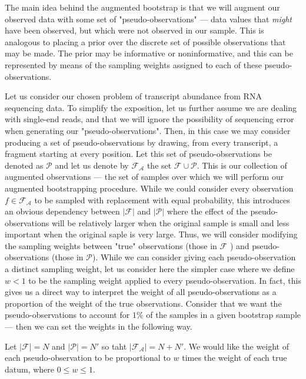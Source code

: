 The main idea behind the augmented bootstrap is that we will augment our observed data with some set 
of "pseudo-observations" --- data values that \textit{might} have been observed, but which were not observed 
in our sample.  This is analogous to placing a prior over the discrete set of possible observations 
that may be made. The prior may be informative or noninformative, and this can be represented by means 
of the sampling weights assigned to each of these pseudo-observations.

Let us consider our chosen problem of transcript abundance from RNA sequencing data. To simplify the 
exposition, let us further assume we are dealing with single-end reads, and that we will ignore the 
possibility of sequencing error when generating our "pseudo-observations". Then, in this case we 
may consider producing a set of pseudo-observations by drawing, from every transcript, a fragment 
starting at every position.  Let this set of pseudo-observations be denoted as $\mathcal{P}$ and 
let us denote by $\mathcal{F_{A}}$ the set $\mathcal{F} \cup \mathcal{P}$. This is our collection 
of augmented observations — the set of samples over which we will perform our augmented 
bootstrapping procedure.  While we could consider every observation $f \in \mathcal{F_{A}}$ to be 
sampled with replacement with equal probability, this introduces an obvious dependency between 
$\left|\mathcal{F}\right|$ and $\left|\mathcal{P}\right|$ where the effect of the 
pseudo-observations will be relatively larger when the original sample is small and less important 
when the original saple is very large.  Thus, we will consider modifying the sampling weights 
between "true" observations (those in $\mathcal{F}$ ) and pseudo-observations 
(those in $\mathcal{P}$).  While we can consider giving each pseudo-observation a distinct sampling 
weight, let us consider here the simpler case where we define $w < 1$ to be the sampling weight 
applied to every pseudo-observation.  In fact, this gives us a direct way to interpret the weight 
of all pseudo-observations as a proportion of the weight of the true observations.  Consider that 
we want the pseudo-observations to account for $1\%$ of the samples in a given bootstrap sample — 
then we can set the weights in the following way.

Let $\left|\mathcal{F}\right| = N$ and $\left| \mathcal{P} \right| = N'$ so taht 
$\left| \mathcal{F_{A}} \right| = N + N'$.  We would like the weight of each pseudo-observation 
to be proportional to $w$ times the weight of each true datum, where $0 \le w \le 1$. 

